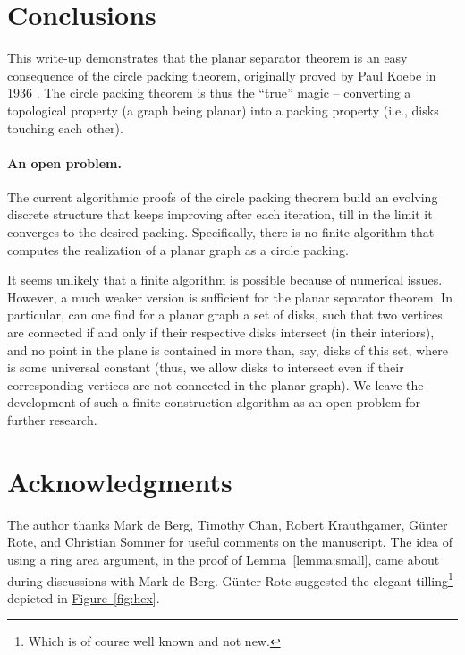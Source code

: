 \documentclass[12pt]{article}
\theoremstyle{remark}\theoremheaderfont{\sf}\theorembodyfont{\upshape}\newtheorem{defn}[theorem]{Definition}
\providecommand{\si}[1]{#1}
\newcommand{\HLink}[2]{\hyperref[#2]{#1~\ref*{#2}}}
\newcommand{\lemref}[1]{\HLink{Lemma}{lemma:#1}}
\newcommand{\figref}[1]{\HLink{Figure}{fig:#1}}
\begin{document}
\section{Conclusions}

This write-up demonstrates that the planar separator theorem is an
easy consequence of the circle packing theorem, originally proved by
Paul Koebe in 1936 \cite{k-kdka-36}.  The circle packing theorem is
thus the ``true'' magic -- converting a topological property (a graph
being planar) into a packing property (i.e., disks touching each
other).

\paragraph{An open problem.}

The current algorithmic proofs of the circle packing theorem build an
evolving discrete structure that keeps improving after each iteration,
till in the limit it converges to the desired packing.  Specifically,
there is no finite algorithm that computes the realization of a planar
graph as a circle packing.

It seems unlikely that a finite algorithm is possible because of
numerical issues. However, a much weaker version is sufficient for the
planar separator theorem. In particular, can one find for a planar
graph a set of disks, such that two vertices are connected if and only
if their respective disks intersect (in their interiors), and no point
in the plane is contained in more than, say,  disks of this set,
where  is some universal constant (thus, we allow disks to
intersect even if their corresponding vertices are not connected in
the planar graph). We leave the development of such a finite
construction algorithm as an open problem for further research.






\section*{Acknowledgments}
The author thanks Mark \si{de} Berg, Timothy Chan, Robert Krauthgamer,
G\"u\si{nter} Rote, and Christian Sommer for useful comments on the
manuscript. The idea of using a ring area argument, in the proof of
\lemref{small}, came about during discussions with Mark \si{de}
Berg. G\"u\si{nter} Rote suggested the elegant tilling\footnote{Which
   is of course well known and not new.} depicted in \figref{hex}.
\end{document}
